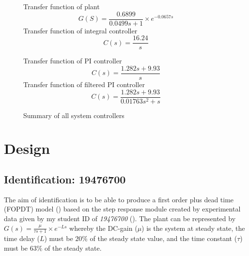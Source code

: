 \documentclass[
	12pt, %
]{fphw}
\begin{document}
\begin{figure}[!htb]
	\begin{problem}
	\begin{center}

        Transfer function of plant
	\begin{equation}
        G(S) = \frac{0.6899}{0.0499s + 1} \times e^{-0.0657s}
	\end{equation}
     Transfer function of integral controller
	\begin{equation}
        C(s) = \frac{16.24}{s}
	\end{equation}

    Transfer function of PI controller
	\begin{equation}
        C(s) = \frac{1.282s + 9.93}{s}
	\end{equation}
    Transfer function of filtered PI controller
	\begin{equation}
        C(s) = \frac{1.282s + 9.93}{0.01763s^2 + s}
	\end{equation}
	\end{center}
	\end{problem}

	\caption{Summary of all system controllers}
	\label{controllers}
\end{figure}
\section{Design}
\subsection{Identification: 19476700}
The aim of identification is to be able to produce a first order plus dead time (FOPDT) model (\cite{lec4_higher_order}) based on the step response module created by experimental data given by my student ID of \emph{19476700} (\cite{ass}). The plant can be represented by $G(s) = \frac{\mu}{\tau s + 1} \times e^{-Ls}$ whereby the DC-gain ($\mu$) is the system at steady state, the time delay ($L$) must be $20\%$ of the steady state value, and the time constant ($\tau$) must be $63\%$ of the steady state.\par
\end{document}
